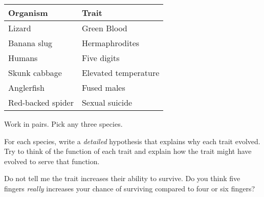 \documentclass[t]{beamer}
\begin{document}
%
\begin{frame}

\hangpara \begin{tabular}{@{}ll@{}}
\toprule
Organism			& Trait \\
\midrule
Lizard				& Green Blood \\
Banana slug			& Hermaphrodites \\
Humans				& Five digits \\
Skunk cabbage		& Elevated temperature \\
Anglerfish			& Fused males \\
Red-backed spider	& Sexual suicide \\
\bottomrule
\end{tabular}

\bigskip

\hangpara Work in pairs. Pick any three species.

\hangpara For each species, write a \emph{detailed} hypothesis that explains why each trait evolved. Try to think of the function of each trait and explain how the trait might have evolved to serve that function.

\hangpara  Do not tell me the trait increases their ability to survive. Do you think five fingers \emph{really} increases your chance of surviving compared to four or six fingers?

\end{frame}
%
\end{document}
